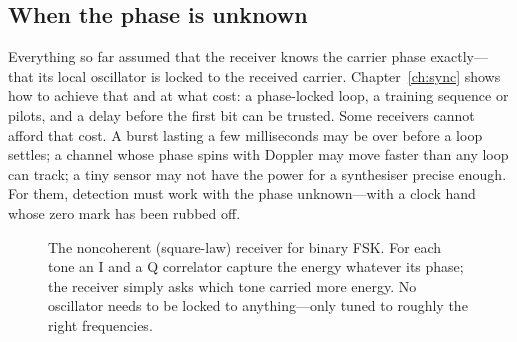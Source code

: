 \subsection{When the phase is unknown}

Everything so far assumed that the receiver knows the carrier phase exactly---that its local
oscillator is locked to the received carrier. Chapter~\ref{ch:sync} shows how to achieve that
and at what cost: a phase-locked loop, a training sequence or pilots, and a delay before the
first bit can be trusted. Some receivers cannot afford that cost. A burst lasting a few
milliseconds may be over before a loop settles; a channel whose phase spins with Doppler may
move faster than any loop can track; a tiny sensor may not have the power for a synthesiser
precise enough. For them, detection must work with the phase unknown---with a clock hand whose
zero mark has been rubbed off.

\begin{figure}[H]
\centering
{}
\caption{The noncoherent (square-law) receiver for binary FSK. For each tone an I and a Q
correlator capture the energy whatever its phase; the receiver simply asks which tone carried more
energy. No oscillator needs to be locked to anything---only tuned to roughly the right
frequencies.}
\label{fig:ch09_ncfsk_rx}
\end{figure}

